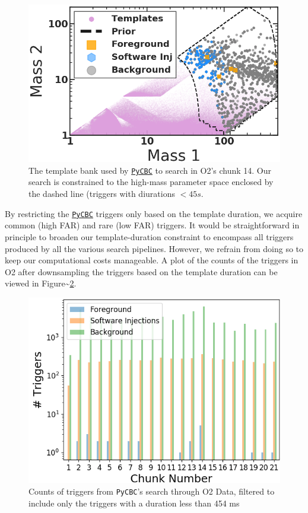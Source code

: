\documentclass[%
 reprint,
 amsmath,amssymb,
 aps,
]{revtex4}
\begin{document}
\begin{figure}[!h]

{\centering \includegraphics[width=0.75\linewidth]{images/template_bank_masses} 

}

\caption[High-mass BCR search space.]{The template bank used by \href{https://pycbc.org/}{\texttt{PyCBC}} to search in O2's chunk 14. Our search is constrained to the high-mass parameter space enclosed by the dashed line (triggers with diurations \(<45s\).}\label{fig:templateBank}
\end{figure}

By restricting the \href{https://pycbc.org/}{\texttt{PyCBC}} triggers only based on the template duration, we acquire common (high FAR) and rare (low
FAR) triggers. It would be straightforward in principle to broaden our template-duration constraint to encompass all
triggers produced by all the various search pipelines. However, we refrain from doing so to keep our computational costs
manageable. A plot of the counts of the triggers in O2 after downsampling the triggers based on the template duration
can be viewed in Figure\textasciitilde\ref{fig:o2FilteredTrigCount}.



\begin{figure}[!h]

{\centering \includegraphics[width=0.75\linewidth]{images/O2_filtered_trigger_counts} 

}

\caption[Count of triggers in PyCBC O2 search shorter than 454 ms]{Counts of triggers from \texttt{PyCBC}'s search through O2 Data, filtered to include only the triggers with a duration less than 454 ms}\label{fig:o2FilteredTrigCount}
\end{figure}
\end{document}
